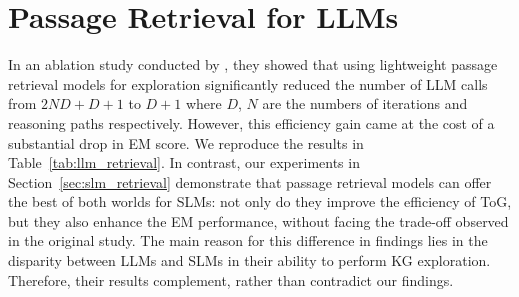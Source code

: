 \documentclass[11pt]{article}
\begin{document}
\section{Passage Retrieval for LLMs}
\label{sec:llm_retrieval}
In an ablation study conducted by \citet{sun2024thinkongraph}, they showed that using lightweight passage retrieval models for exploration significantly reduced the number of LLM calls from $2ND+D+1$ to $D+1$ where $D$, $N$ are the numbers of iterations and reasoning paths respectively. However, this efficiency gain came at the cost of a substantial drop in EM score. We reproduce the results in Table~\ref{tab:llm_retrieval}. In contrast, our experiments in Section~\ref{sec:slm_retrieval} demonstrate that passage retrieval models can offer the best of both worlds for SLMs: not only do they improve the efficiency of ToG, but they also enhance the EM performance, without facing the trade-off observed in the original study. The main reason for this difference in findings lies in the disparity between LLMs and SLMs in their ability to perform KG exploration. Therefore, their results complement, rather than contradict our findings.
\end{document}

